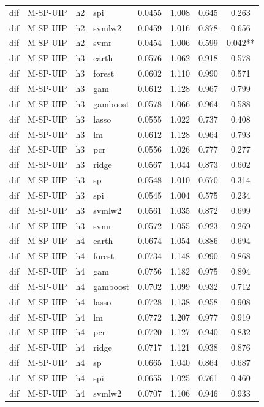 \begin{ThreePartTable}
\begin{longtable}[t]{llclcccc}
dif & M-SP-UIP & h2 & spi & 0.0455 & 1.008 & 0.645 & 0.263\\
dif & M-SP-UIP & h2 & svmlw2 & 0.0459 & 1.016 & 0.878 & 0.656\\
dif & M-SP-UIP & h2 & svmr & 0.0454 & 1.006 & 0.599 & 0.042**\\
\addlinespace
dif & M-SP-UIP & h3 & earth & 0.0576 & 1.062 & 0.918 & 0.578\\
dif & M-SP-UIP & h3 & forest & 0.0602 & 1.110 & 0.990 & 0.571\\
dif & M-SP-UIP & h3 & gam & 0.0612 & 1.128 & 0.967 & 0.799\\
dif & M-SP-UIP & h3 & gamboost & 0.0578 & 1.066 & 0.964 & 0.588\\
dif & M-SP-UIP & h3 & lasso & 0.0555 & 1.022 & 0.737 & 0.408\\
dif & M-SP-UIP & h3 & lm & 0.0612 & 1.128 & 0.964 & 0.793\\
dif & M-SP-UIP & h3 & pcr & 0.0556 & 1.026 & 0.777 & 0.277\\
dif & M-SP-UIP & h3 & ridge & 0.0567 & 1.044 & 0.873 & 0.602\\
dif & M-SP-UIP & h3 & sp & 0.0548 & 1.010 & 0.670 & 0.314\\
dif & M-SP-UIP & h3 & spi & 0.0545 & 1.004 & 0.575 & 0.234\\
dif & M-SP-UIP & h3 & svmlw2 & 0.0561 & 1.035 & 0.872 & 0.699\\
dif & M-SP-UIP & h3 & svmr & 0.0572 & 1.055 & 0.923 & 0.269\\
\addlinespace
dif & M-SP-UIP & h4 & earth & 0.0674 & 1.054 & 0.886 & 0.694\\
dif & M-SP-UIP & h4 & forest & 0.0734 & 1.148 & 0.990 & 0.868\\
dif & M-SP-UIP & h4 & gam & 0.0756 & 1.182 & 0.975 & 0.894\\
dif & M-SP-UIP & h4 & gamboost & 0.0702 & 1.099 & 0.932 & 0.712\\
dif & M-SP-UIP & h4 & lasso & 0.0728 & 1.138 & 0.958 & 0.908\\
dif & M-SP-UIP & h4 & lm & 0.0772 & 1.207 & 0.977 & 0.919\\
dif & M-SP-UIP & h4 & pcr & 0.0720 & 1.127 & 0.940 & 0.832\\
dif & M-SP-UIP & h4 & ridge & 0.0717 & 1.121 & 0.938 & 0.876\\
dif & M-SP-UIP & h4 & sp & 0.0665 & 1.040 & 0.864 & 0.687\\
dif & M-SP-UIP & h4 & spi & 0.0655 & 1.025 & 0.761 & 0.460\\
dif & M-SP-UIP & h4 & svmlw2 & 0.0707 & 1.106 & 0.946 & 0.933\\

\end{longtable}
\end{ThreePartTable}
